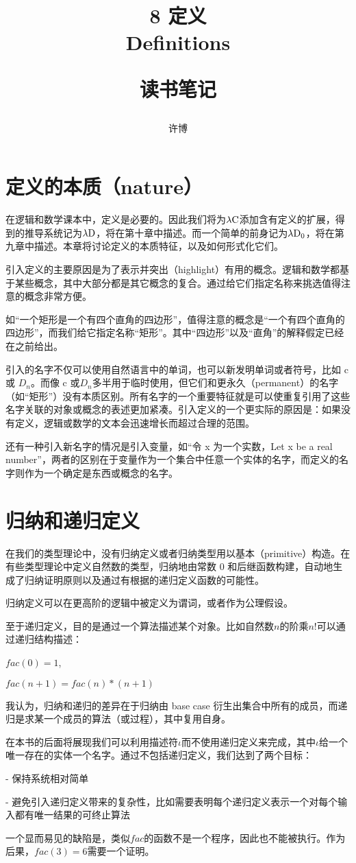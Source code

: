 \documentclass[UTF8]{article}
\title{8 定义\\Definitions\\[2ex]\begin{large}读书笔记\end{large}}
\author{许博}
\date{}
\begin{document}
\maketitle
	\section{定义的本质（nature）}
	\noindent
	在逻辑和数学课本中，定义是必要的。因此我们将为$\lambda{\rm C}$添加含有定义的扩展，得到的推导系统记为$\lambda{\rm D}$，将在第十章中描述。而一个简单的前身记为$\lambda{\rm D_0}$，将在第九章中描述。本章将讨论定义的本质特征，以及如何形式化它们。
	
		引入定义的主要原因是为了表示并突出（highlight）有用的概念。逻辑和数学都基于某些概念，其中大部分都是其它概念的复合。通过给它们指定名称来挑选值得注意的概念非常方便。
		
		如“一个矩形是一个有四个直角的四边形”，值得注意的概念是“一个有四个直角的四边形”，而我们给它指定名称“矩形”。其中“四边形”以及“直角”的解释假定已经在之前给出。
		
		引入的名字不仅可以使用自然语言中的单词，也可以新发明单词或者符号，比如 c 或 $D_n$。而像 c 或$D_n$多半用于临时使用，但它们和更永久（permanent）的名字（如“矩形”）没有本质区别。所有名字的一个重要特征就是可以使重复引用了这些名字关联的对象或概念的表述更加紧凑。引入定义的一个更实际的原因是：如果没有定义，逻辑或数学的文本会迅速增长而超过合理的范围。
		
		还有一种引入新名字的情况是引入变量，如“令 x 为一个实数，Let x be a real number”，两者的区别在于变量作为一个集合中任意一个实体的名字，而定义的名字则作为一个确定是东西或概念的名字。
	
	\section{归纳和递归定义}
	\noindent
	在我们的类型理论中，没有归纳定义或者归纳类型用以基本（primitive）构造。在有些类型理论中定义自然数的类型，归纳地由常数 0 和后继函数构建，自动地生成了归纳证明原则以及通过有根据的递归定义函数的可能性。
	
		归纳定义可以在更高阶的逻辑中被定义为谓词，或者作为公理假设。
		
		至于递归定义，目的是通过一个算法描述某个对象。比如自然数$n$的阶乘$n!$可以通过递归结构描述：
		
		$fac(0) = 1$,
		
		$fac(n+1)=fac(n)*(n+1)$
		
		我认为，归纳和递归的差异在于归纳由 base case 衍生出集合中所有的成员，而递归是求某一个成员的算法（或过程），其中复用自身。
		
		在本书的后面将展现我们可以利用描述符$\iota$而不使用递归定义来完成，其中$\iota$给一个唯一存在的实体一个名字。通过不包括递归定义，我们达到了两个目标：
		
		\noindent
		- 保持系统相对简单
		
		\noindent
		- 避免引入递归定义带来的复杂性，比如需要表明每个递归定义表示一个对每个输入都有唯一结果的可终止算法
		
		一个显而易见的缺陷是，类似$fac$的函数不是一个程序，因此也不能被执行。作为后果，$fac(3)=6$需要一个证明。
\end{document}
